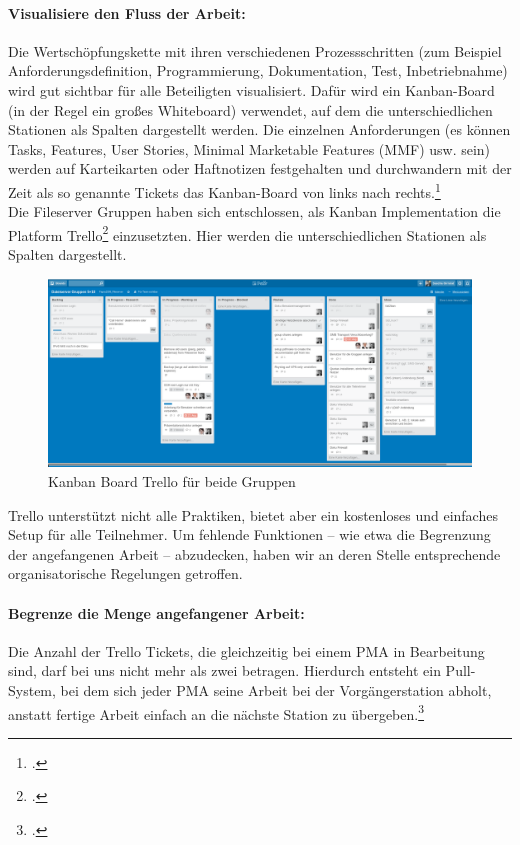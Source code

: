 \paragraph{Visualisiere den Fluss der Arbeit:}Die Wertschöpfungskette mit ihren
verschiedenen Prozessschritten (zum Beispiel Anforderungsdefinition,
Programmierung, Dokumentation, Test, Inbetriebnahme) wird gut sichtbar für alle
Beteiligten visualisiert. Dafür wird ein Kanban-Board (in der Regel ein großes
Whiteboard) verwendet, auf dem die unterschiedlichen Stationen als Spalten
dargestellt werden. Die einzelnen Anforderungen (es können Tasks, Features,
User Stories, Minimal Marketable Features (MMF) usw. sein) werden auf
Karteikarten oder Haftnotizen festgehalten und durchwandern mit der Zeit als so
genannte Tickets das Kanban-Board von links nach rechts.\footcite{wikiKanban}\\

Die Fileserver Gruppen haben sich entschlossen, als Kanban Implementation die
Platform Trello\footcite{trelloboard} einzusetzten. Hier werden die
unterschiedlichen Stationen als Spalten dargestellt.

\begin{figure}[hbt!]
	\centering
		\includegraphics[scale=0.23]{images/trello.png}
	\caption[Screenshot des Kanban Board Trello für beide Gruppen]{Kanban Board Trello für beide Gruppen}
	\label{fig:nettop}
\end{figure}

Trello unterstützt nicht alle Praktiken, bietet aber ein kostenloses und einfaches Setup für alle Teilnehmer. Um fehlende Funktionen -- wie etwa die Begrenzung der angefangenen Arbeit -- abzudecken, haben wir an deren Stelle entsprechende organisatorische Regelungen getroffen.

\paragraph{Begrenze die Menge angefangener Arbeit:}Die Anzahl der Trello Tickets, die gleichzeitig bei einem PMA in Bearbeitung sind, darf bei uns nicht mehr als zwei betragen. Hierdurch entsteht ein Pull-System, bei dem sich jeder PMA seine Arbeit bei der Vorgängerstation abholt, anstatt fertige Arbeit einfach an die nächste Station zu übergeben.\footcite{wikiKanban}

